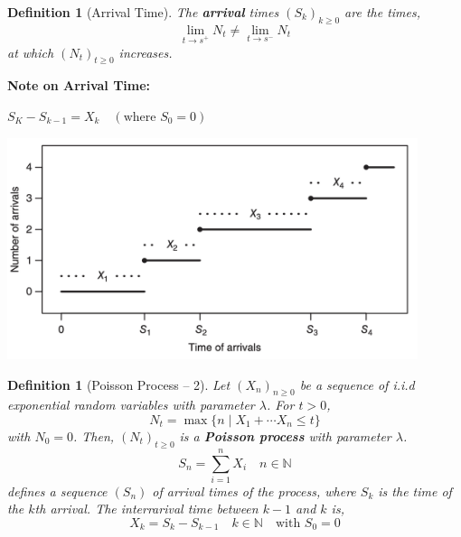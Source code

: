 \documentclass{tufte-handout}
\newtheorem{defn}[thm]{Definition}
\begin{document}
\begin{defn}[Arrival Time]
  The \textbf{arrival} times $(S_k)_{k \geq 0}$ are the times,
  \[\lim _{t \rightarrow s^+} N_{t} \neq \lim _{t \rightarrow s^-} N_{t}\]
  \noindent at which $(N_t)_{t \geq 0}$ increases.
\end{defn} 

\begin{marginfigure}
  \textbf{Note on Arrival Time:}

  \noindent $S_{K}-S_{k-1}=X_{k} \quad\left(\text{where } S_{0}=0\right)$

  \begin{center}
    \includegraphics[width=0.9\textwidth]{fig-19.png}
    \caption{Arrival times $S_1, S_2, \cdots$ and interarrival times $X_1, X_2, \cdots$.}
  \end{center}
\end{marginfigure}

\begin{defn}[Poisson Process -- 2]
  Let $(X_n)_{n \geq 0}$ be a sequence of i.i.d exponential random variables with parameter $\lambda$. For $t > 0$, 
  \[N_t = \max \{n \mid X_1 + \cdots X_n \leq t\}\]
  \noindent with $N_0 = 0$. Then, $(N_t)_{t \geq 0}$ is a \textbf{Poisson process} with parameter $\lambda$.
  \[S_n = \sum_{i=1}^n X_i \quad n \in \mathbb{N}\]
  \noindent defines a sequence $(S_n)$ of arrival times of the process, where $S_k$ is the time of the $k$th arrival. The interrarival time between $k-1$ and $k$ is,
  \[X_k = S_k - S_{k-1} \quad k \in \mathbb{N} \quad \text{with $S_0 = 0$}\]
\end{defn}
\end{document}
